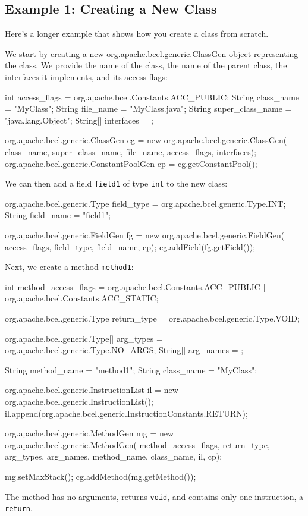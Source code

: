 \subsection{Example 1: Creating a New Class}
Here's a longer example that shows how you create
a class from scratch.

We start by creating a new \url{org.apache.bcel.generic.ClassGen}
object representing the class. We provide the name of the class,
the name of the parent class, the interfaces it implements,
and its access flags:
\begin{listing}{1}
   int access_flags = org.apache.bcel.Constants.ACC_PUBLIC;
   String class_name = "MyClass";
   String file_name = "MyClass.java";
   String super_class_name = "java.lang.Object";
   String[] interfaces = {};

   org.apache.bcel.generic.ClassGen cg = 
      new org.apache.bcel.generic.ClassGen(
         class_name, super_class_name, file_name,
         access_flags, interfaces);
   org.apache.bcel.generic.ConstantPoolGen cp = cg.getConstantPool();
\end{listing}

We can then add a field {\tt field1} of type {\tt int}
to the new class:
\begin{listingcont}
   org.apache.bcel.generic.Type field_type = 
      org.apache.bcel.generic.Type.INT;
   String field_name = "field1"; 

   org.apache.bcel.generic.FieldGen fg =
      new org.apache.bcel.generic.FieldGen(
         access_flags, field_type, field_name, cp);
   cg.addField(fg.getField());
\end{listingcont}

Next, we create a method {\tt method1}:
\begin{listingcont}
   int method_access_flags = 
      org.apache.bcel.Constants.ACC_PUBLIC | 
      org.apache.bcel.Constants.ACC_STATIC;

   org.apache.bcel.generic.Type return_type = 
      org.apache.bcel.generic.Type.VOID;

   org.apache.bcel.generic.Type[] arg_types = 
      org.apache.bcel.generic.Type.NO_ARGS;
   String[] arg_names = {};

   String method_name = "method1";
   String class_name = "MyClass";

   org.apache.bcel.generic.InstructionList il = 
      new org.apache.bcel.generic.InstructionList();
   il.append(org.apache.bcel.generic.InstructionConstants.RETURN);

   org.apache.bcel.generic.MethodGen mg = 
      new org.apache.bcel.generic.MethodGen(
         method_access_flags, return_type,  arg_types,
         arg_names, method_name, class_name, il, cp);

   mg.setMaxStack();
   cg.addMethod(mg.getMethod());
\end{listingcont}
The method has no arguments, returns {\tt void}, and contains
only one instruction, a {\tt return}.

